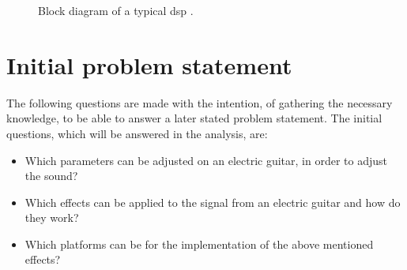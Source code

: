 
\begin{figure}
\centering
\def\svgwidth{\columnwidth}

\caption{Block diagram of a typical \gls{dsp} \cite{AnalogDialogue}.}
		\label{fig:real_life_drawing}
\end{figure}

\section{Initial problem statement}
The following questions are made with the intention, of gathering the necessary knowledge, to be able to answer  a later stated problem statement. The initial questions, which will be answered in the analysis, are:

\begin{itemize}
\item Which parameters can be adjusted on an electric guitar, in order to adjust the sound?
\item Which effects can be applied to the signal from an electric guitar and how do they work?
\item Which platforms can be for the implementation of the above mentioned effects? 
\end{itemize}